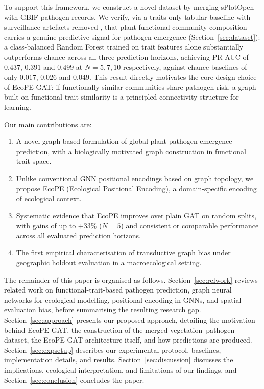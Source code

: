 \documentclass[a4paper,fleqn]{cas-sc}
\begin{document}
To support this framework, we construct a novel dataset by merging sPlotOpen with GBIF pathogen records. We verify, via a traits-only tabular baseline with surveillance artefacts removed \citep{beck2014}, that plant functional community composition carries a genuine predictive signal for pathogen emergence (Section~\ref{sec:dataset}): a class-balanced Random Forest trained on trait features alone substantially outperforms chance across all three prediction horizons, achieving PR-AUC of $0.437$, $0.391$ and $0.499$ at $N=5,7,10$ respectively, against chance baselines of only $0.017$, $0.026$ and $0.049$. This result directly motivates the core design choice of EcoPE-GAT: if functionally similar communities share pathogen risk, a graph built on functional trait similarity is a principled connectivity structure for learning.

Our main contributions are:
\begin{enumerate}[leftmargin=1.4em]
  \item A novel graph-based formulation of global plant pathogen emergence prediction, with a biologically motivated graph construction in functional trait space.
  \item Unlike conventional GNN positional encodings based on graph topology, we propose EcoPE (Ecological Positional Encoding), a domain-specific encoding of ecological context.
  \item Systematic evidence that EcoPE improves over plain GAT on random splits, with gains of up to $+33\%$ ($N=5$) and consistent or comparable performance across all evaluated prediction horizons.
  \item The first empirical characterisation of transductive graph bias under geographic holdout evaluation in a macroecological setting.
\end{enumerate}

The remainder of this paper is organised as follows. Section~\ref{sec:relwork} reviews related work on functional-trait-based pathogen prediction, graph neural networks for ecological modelling, positional encoding in GNNs, and spatial evaluation bias, before summarising the resulting research gap. Section~\ref{sec:approach} presents our proposed approach, detailing the motivation behind EcoPE-GAT, the construction of the merged vegetation--pathogen dataset, the EcoPE-GAT architecture itself, and how predictions are produced. Section~\ref{sec:expsetup} describes our experimental protocol, baselines, implementation details, and results. Section~\ref{sec:discussion} discusses the implications, ecological interpretation, and limitations of our findings, and Section~\ref{sec:conclusion} concludes the paper.
\end{document}
